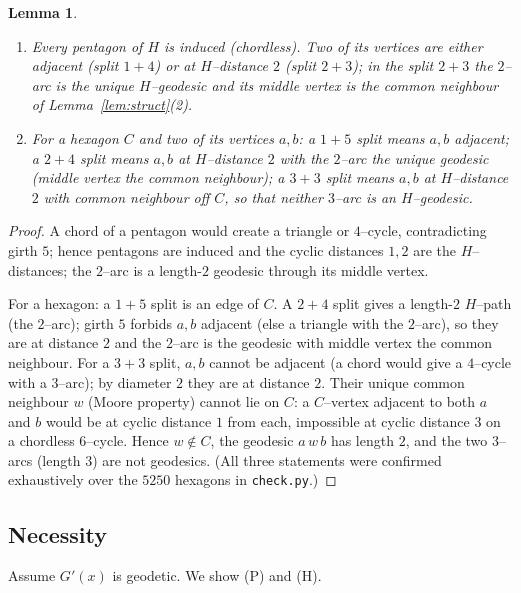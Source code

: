 \documentclass{amsart}
\newtheorem{lemma}{Lemma}
\theoremstyle{definition}
\begin{document}
\begin{lemma}\label{lem:cycles}
\begin{enumerate}
\item Every pentagon of $H$ is induced (chordless). Two of its vertices are
either adjacent (split $1{+}4$) or at $H$--distance $2$ (split $2{+}3$); in the
split $2{+}3$ the $2$--arc is the unique $H$--geodesic and its middle vertex is
the common neighbour of Lemma~\ref{lem:struct}(2).
\item For a hexagon $C$ and two of its vertices $a,b$: a $1{+}5$ split means
$a,b$ adjacent; a $2{+}4$ split means $a,b$ at $H$--distance $2$ with the
$2$--arc the unique geodesic (middle vertex the common neighbour); a $3{+}3$
split means $a,b$ at $H$--distance $2$ with common neighbour \emph{off} $C$, so
that neither $3$--arc is an $H$--geodesic.
\end{enumerate}
\end{lemma}

\begin{proof}
A chord of a pentagon would create a triangle or $4$--cycle, contradicting
girth $5$; hence pentagons are induced and the cyclic distances $1,2$ are the
$H$--distances; the $2$--arc is a length-$2$ geodesic through its middle vertex.

For a hexagon: a $1{+}5$ split is an edge of $C$. A $2{+}4$ split gives a
length-$2$ $H$--path (the $2$--arc); girth $5$ forbids $a,b$ adjacent (else a
triangle with the $2$--arc), so they are at distance $2$ and the $2$--arc is the
geodesic with middle vertex the common neighbour. For a $3{+}3$ split, $a,b$
cannot be adjacent (a chord would give a $4$--cycle with a $3$--arc); by
diameter $2$ they are at distance $2$. Their unique common neighbour $w$
(Moore property) cannot lie on $C$: a $C$--vertex adjacent to both $a$ and $b$
would be at cyclic distance $1$ from each, impossible at cyclic distance $3$ on
a chordless $6$--cycle. Hence $w\notin C$, the geodesic $a\,w\,b$ has length $2$,
and the two $3$--arcs (length $3$) are not geodesics. (All three statements were
confirmed exhaustively over the $5250$ hexagons in \texttt{check.py}.)
\end{proof}

\subsection{Necessity}

Assume $G'(x)$ is geodetic. We show (P) and (H).
\end{document}
